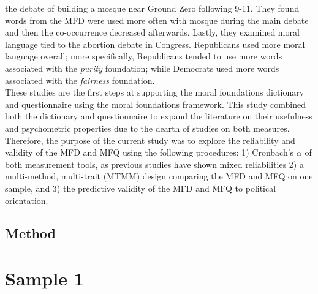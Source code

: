 \documentclass[english,man]{apa6}
\theoremstyle{definition}
\theoremstyle{definition}
\theoremstyle{definition}
\theoremstyle{remark}
\begin{document}
the debate of building a mosque near Ground Zero following 9-11. They
found words from the MFD were used more often with mosque during the
main debate and then the co-occurrence decreased afterwards. Lastly,
they examined moral language tied to the abortion debate in Congress.
Republicans used more moral language overall; more specifically,
Republicans tended to use more words associated with the \emph{purity}
foundation; while Democrats used more words associated with the
\emph{fairness} foundation.\\
These studies are the first steps at supporting the moral foundations
dictionary and questionnaire using the moral foundations framework. This
study combined both the dictionary and questionnaire to expand the
literature on their usefulness and psychometric properties due to the
dearth of studies on both measures. Therefore, the purpose of the
current study was to explore the reliability and validity of the MFD and
MFQ using the following procedures: 1) Cronbach's \(\alpha\) of both
measurement tools, as previous studies have shown mixed reliabilities 2)
a multi-method, multi-trait (MTMM) design comparing the MFD and MFQ on
one sample, and 3) the predictive validity of the MFD and MFQ to
political orientation.

\subsection{Method}\label{method}

\section{Sample 1}\label{sample-1}
\end{document}
